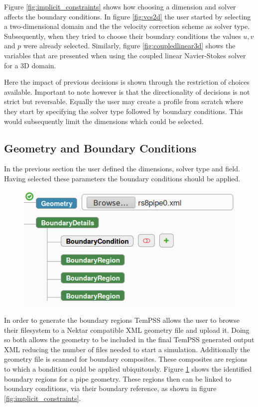 \documentclass[11pt, a4paper]{report}
\begin{document}
Figure \ref{fig:implicit_constraints} shows how choosing a dimension and solver affects the boundary conditions. In figure \ref{fig:vcs2d} the user started by selecting a two-dimensional domain and the the velocity correction scheme as solver type. Subsequently, when they tried to choose their boundary conditions the values $u, v$ and $p$ were already selected. Similarly, figure \ref{fig:coupledlinear3d} shows the variables that are presented when using the coupled linear Navier-Stokes solver for a 3D domain.

Here the impact of previous decisions is shown through the restriction of choices available. Important to note however  is that the directionality of decisions is not strict but reversable. Equally the user may create a profile from scratch where they start by specifying the solver type followed by boundary conditions. This would subsequently limit the dimensions which could be selected.

\subsection{Geometry and Boundary Conditions}
In the previous section the user defined the dimensions, solver type and field. Having selected these parameters the boundary conditions should be applied.

\begin{figure}[htb!]
 \centering
 \includegraphics[width=.55\linewidth,  clip=true, trim = 0cm 0cm 0cm 0cm]{geometry_upload}
 \label{fig:geometry_upload}
\end{figure}

In order to generate the boundary regions TemPSS allows the user to browse their filesystem to a Nektar compatible XML geometry file and upload it. Doing so both allows the geometry to be included in the final TemPSS generated output XML reducing the number of files needed to start a simulation. Additionally the geometry file is scanned for boundary composites. These composites are regions to which a bondition could be applied ubiquitously. Figure \ref{fig:geometry_upload} shows the identified boundary regions for a pipe geometry. These regions then can be linked to boundary conditions, via their boundary reference, as shown in figure \ref{fig:implicit_constraints}.
\end{document}
